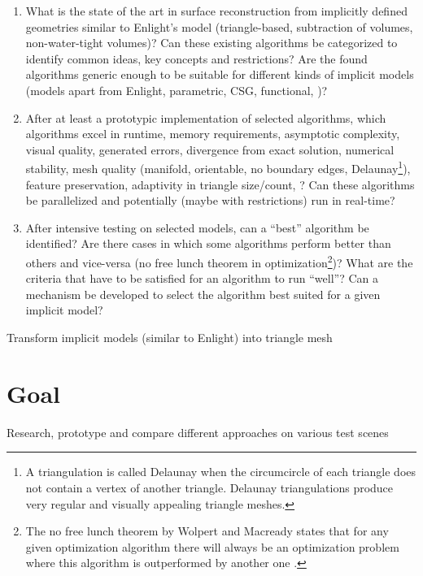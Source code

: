 \begin{enumerate}
	\item What is the state of the art in surface reconstruction from implicitly defined geometries similar to Enlight's model (triangle-based, subtraction of volumes, non-water-tight volumes)? Can these existing algorithms be categorized to identify common ideas, key concepts and restrictions? Are the found algorithms generic enough to be suitable for different kinds of implicit models (models apart from Enlight, parametric, CSG, functional, \etc)?
	
	\item After at least a prototypic implementation of selected algorithms, which algorithms excel in runtime, memory requirements, asymptotic complexity, visual quality, generated errors, divergence from exact solution, numerical stability, mesh quality (manifold, orientable, no boundary edges, Delaunay\footnote{A triangulation is called Delaunay when the circumcircle of each triangle does not contain a vertex of another triangle. Delaunay triangulations produce very regular and visually appealing triangle meshes.}), feature preservation, adaptivity in triangle size/count, \etc? Can these algorithms be parallelized and potentially (maybe with restrictions) run in real-time?
	
	\item After intensive testing on selected models, can a \enquote{best} algorithm be identified? Are there cases in which some algorithms perform better than others and vice-versa (\cf no free lunch theorem in optimization\footnote{The no free lunch theorem by Wolpert and Macready states that for any given optimization algorithm there will always be an optimization problem where this algorithm is outperformed by another one \cite{no_free_lunch}. })? What are the criteria that have to be satisfied for an algorithm to run \enquote{well}? Can a mechanism be developed to select the algorithm best suited for a given implicit model?
\end{enumerate}


Transform implicit models (similar to Enlight) into triangle mesh

\section{Goal}
Research, prototype and compare different approaches on various test scenes
